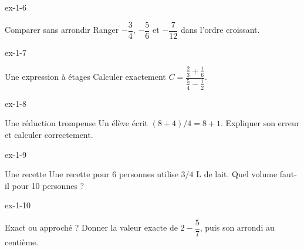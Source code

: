 \clearpage{}
\begin{blocLivre}{ex-1-6}\begin{exercice}[2]{Comparer sans arrondir}
Ranger $-\dfrac34$, $-\dfrac56$ et $-\dfrac7{12}$ dans l’ordre croissant.
\end{exercice}\end{blocLivre}
\begin{blocLivre}{ex-1-7}\begin{exercice}[2]{Une expression à étages}
Calculer exactement $C=\dfrac{\frac23+\frac16}{\frac54-\frac12}$.
\end{exercice}\end{blocLivre}
\begin{blocLivre}{ex-1-8}\begin{exercice}[2]{Une réduction trompeuse}
Un élève écrit $(8+4)/4=8+1$. Expliquer son erreur et calculer correctement.
\end{exercice}\end{blocLivre}
\begin{blocLivre}{ex-1-9}\begin{exercice}[2]{Une recette}
Une recette pour 6 personnes utilise $3/4$ L de lait. Quel volume faut-il pour 10 personnes ?
\end{exercice}\end{blocLivre}
\begin{blocLivre}{ex-1-10}\begin{exercice}[2]{Exact ou approché ?}
Donner la valeur exacte de $2-\dfrac57$, puis son arrondi au centième.
\end{exercice}\end{blocLivre}

